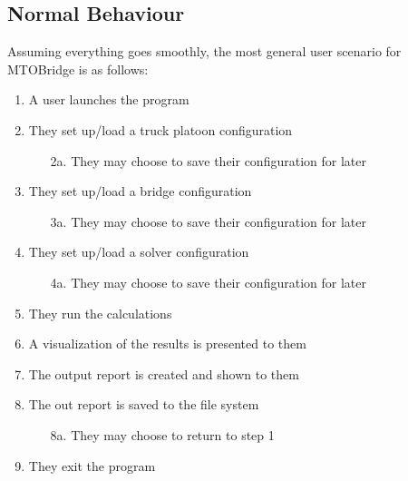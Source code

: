 \documentclass[12pt, titlepage]{article}
\begin{document}
\subsection{Normal Behaviour}
Assuming everything goes smoothly, the most general user scenario for MTOBridge is as follows:\\
\begin{enumerate}
\item A user launches the program
\item They set up/load a truck platoon configuration
    \begin{itemize}
        \item [2a.] They may choose to save their configuration for later
    \end{itemize}
\item They set up/load a bridge configuration
    \begin{itemize}
        \item [3a.] They may choose to save their configuration for later
    \end{itemize}
\item They set up/load a solver configuration
    \begin{itemize}
        \item [4a.] They may choose to save their configuration for later
    \end{itemize}
\item They run the calculations
\item A visualization of the results is presented to them
\item The output report is created and shown to them
\item The out report is saved to the file system
    \begin{itemize}
        \item [8a.] They may choose to return to step 1
    \end{itemize}
\item They exit the program
\end{enumerate}
\end{document}
